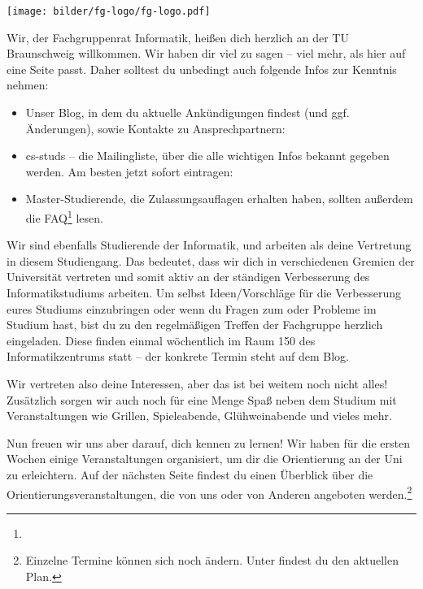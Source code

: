 \documentclass[
  final,
  a4paper,              %
  style=screen,
  nexus,                %
]{tubsartcl}
\begin{document}
\pagestyle{empty}


\begin{center}
\noindent\texttt{[image: bilder/fg-logo/fg-logo.pdf]}
\end{center}

\listoftodos

\begin{multicols}{2}

\noindent{}Wir, der Fachgruppenrat Informatik, heißen dich herzlich an der TU Braunschweig willkommen. 
Wir haben dir viel zu sagen – viel mehr, als hier auf eine Seite passt. Daher solltest du unbedingt auch folgende Infos zur Kenntnis nehmen:

\begin{itemize}[topsep=0em,itemsep=-1ex,partopsep=0em,parsep=1ex]
\item Unser Blog, in dem du aktuelle Ankündigungen findest (und ggf. Änderungen), sowie Kontakte zu Ansprechpartnern: \\\fginfoUrl

\item cs-studs -- die Mailingliste, über die alle wichtigen Infos bekannt gegeben werden. Am besten jetzt sofort eintragen: \\

\item Master-Studierende, die Zulassungsauflagen erhalten haben, sollten außerdem die FAQ\footnote{} lesen.
\end{itemize}

\noindent{}Wir sind ebenfalls Studierende der Informatik, und arbeiten als deine Vertretung in diesem Studiengang. Das bedeutet, dass wir dich in verschiedenen Gremien der Universität vertreten und somit aktiv an der ständigen Verbesserung des Informatikstudiums arbeiten. Um selbst Ideen/Vorschläge für die Verbesserung eures Studiums einzubringen oder wenn du Fragen zum oder Probleme im Studium hast, bist du zu den regelmäßigen Treffen der Fachgruppe herzlich eingeladen. Diese finden einmal wöchentlich im Raum 150 des Informatikzentrums statt – der konkrete Termin steht auf dem Blog.

Wir vertreten also deine Interessen, aber das ist bei weitem noch nicht alles! Zusätzlich sorgen wir auch noch für eine Menge Spaß neben dem Studium mit Veranstaltungen wie Grillen, Spieleabende, Glühweinabende und vieles mehr.

Nun freuen wir uns aber darauf, dich kennen zu lernen! Wir haben für die ersten Wochen einige Veranstaltungen organisiert, um dir die Orientierung an der Uni zu erleichtern. Auf der nächsten Seite findest du einen Überblick über die Orientierungsveranstaltungen, die von uns oder von Anderen angeboten werden.\footnote{Einzelne Termine können sich noch ändern. Unter  findest du den aktuellen Plan.}


\end{multicols}
\end{document}
